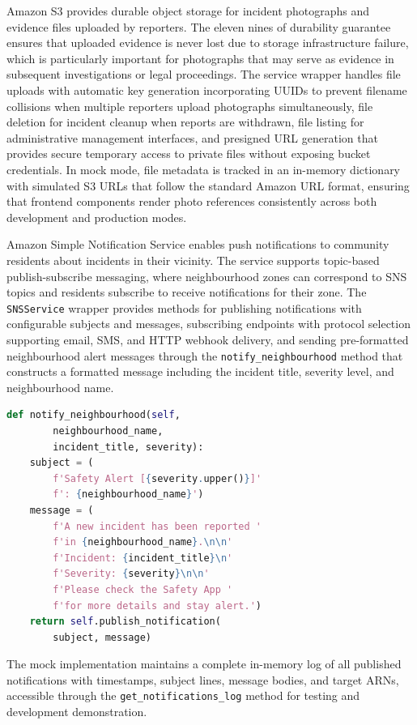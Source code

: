 \documentclass[conference]{IEEEtran}
\begin{document}
Amazon S3 provides durable object storage for incident photographs and evidence files uploaded by reporters. The eleven nines of durability guarantee ensures that uploaded evidence is never lost due to storage infrastructure failure, which is particularly important for photographs that may serve as evidence in subsequent investigations or legal proceedings. The service wrapper handles file uploads with automatic key generation incorporating UUIDs to prevent filename collisions when multiple reporters upload photographs simultaneously, file deletion for incident cleanup when reports are withdrawn, file listing for administrative management interfaces, and presigned URL generation that provides secure temporary access to private files without exposing bucket credentials. In mock mode, file metadata is tracked in an in-memory dictionary with simulated S3 URLs that follow the standard Amazon URL format, ensuring that frontend components render photo references consistently across both development and production modes.

Amazon Simple Notification Service enables push notifications to community residents about incidents in their vicinity. The service supports topic-based publish-subscribe messaging, where neighbourhood zones can correspond to SNS topics and residents subscribe to receive notifications for their zone. The \texttt{SNSService} wrapper provides methods for publishing notifications with configurable subjects and messages, subscribing endpoints with protocol selection supporting email, SMS, and HTTP webhook delivery, and sending pre-formatted neighbourhood alert messages through the \texttt{notify\_neighbourhood} method that constructs a formatted message including the incident title, severity level, and neighbourhood name.

\begin{lstlisting}[language=Python, caption=SNS neighbourhood notification method]
def notify_neighbourhood(self,
        neighbourhood_name,
        incident_title, severity):
    subject = (
        f'Safety Alert [{severity.upper()}]'
        f': {neighbourhood_name}')
    message = (
        f'A new incident has been reported '
        f'in {neighbourhood_name}.\n\n'
        f'Incident: {incident_title}\n'
        f'Severity: {severity}\n\n'
        f'Please check the Safety App '
        f'for more details and stay alert.')
    return self.publish_notification(
        subject, message)
\end{lstlisting}

The mock implementation maintains a complete in-memory log of all published notifications with timestamps, subject lines, message bodies, and target ARNs, accessible through the \texttt{get\_notifications\_log} method for testing and development demonstration.
\end{document}
